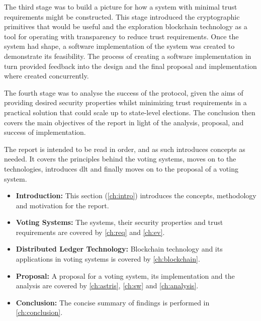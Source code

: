 The third stage was to build a picture for how a system with minimal trust requirements might be constructed. This stage introduced the cryptographic primitives that would be useful and the exploration blockchain technology as a tool for operating with transparency to reduce trust requirements. Once the system had shape, a software implementation of the system was created to demonstrate its feasibility. The process of creating a software implementation in turn provided feedback into the design and the final proposal and implementation where created concurrently.

The fourth stage was to analyse the success of the protocol, given the aims of providing desired security properties whilst minimizing trust requirements in a practical solution that could scale up to state-level elections. The conclusion then covers the main objectives of the report in light of the analysis, proposal, and success of implementation.

The report is intended to be read in order, and as such introduces concepts as needed. It covers the principles behind the voting systems, moves on to the technologies, introduces \gls{dlt} and finally moves on to the proposal of a voting system.

\begin{itemize}
    \item \textbf{Introduction:} This section (\autoref{ch:intro}) introduces the concepts, methodology and motivation for the report.
    \item \textbf{Voting Systems:} The systems, their security properties and trust requirements
          are covered by \autoref{ch:req} and \autoref{ch:ev}. %
    \item \textbf{Distributed Ledger Technology:} Blockchain technology and its applications in voting systems is covered by \autoref{ch:blockchain}.
    \item \textbf{Proposal:} A proposal for a voting system, its implementation and the analysis are covered by \autoref{ch:astris}, \autoref{ch:sw} and \autoref{ch:analysis}.
    \item \textbf{Conclusion:} The concise summary of findings is performed in \autoref{ch:conclusion}.
\end{itemize}




